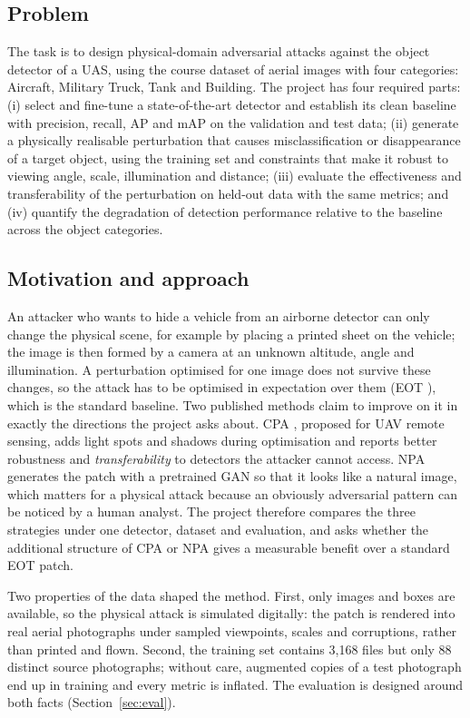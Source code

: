 \documentclass[11pt,a4paper]{article}
\begin{document}
\subsection{Problem}
The task is to design physical-domain adversarial attacks against the object detector of a UAS, using the course dataset of aerial images with four categories: Aircraft, Military Truck, Tank and Building. The project has four required parts: (i) select and fine-tune a state-of-the-art detector and establish its clean baseline with precision, recall, AP and mAP on the validation and test data; (ii) generate a physically realisable perturbation that causes misclassification or disappearance of a target object, using the training set and constraints that make it robust to viewing angle, scale, illumination and distance; (iii) evaluate the effectiveness and transferability of the perturbation on held-out data with the same metrics; and (iv) quantify the degradation of detection performance relative to the baseline across the object categories.

\subsection{Motivation and approach}
An attacker who wants to hide a vehicle from an airborne detector can only change the physical scene, for example by placing a printed sheet on the vehicle; the image is then formed by a camera at an unknown altitude, angle and illumination. A perturbation optimised for one image does not survive these changes, so the attack has to be optimised in expectation over them (EOT \cite{athalye2018}), which is the standard baseline. Two published methods claim to improve on it in exactly the directions the project asks about. CPA \cite{zhang2024cpa}, proposed for UAV remote sensing, adds light spots and shadows during optimisation and reports better robustness and \emph{transferability} to detectors the attacker cannot access. NPA \cite{hu2021npa} generates the patch with a pretrained GAN so that it looks like a natural image, which matters for a physical attack because an obviously adversarial pattern can be noticed by a human analyst. The project therefore compares the three strategies under one detector, dataset and evaluation, and asks whether the additional structure of CPA or NPA gives a measurable benefit over a standard EOT patch.

Two properties of the data shaped the method. First, only images and boxes are available, so the physical attack is simulated digitally: the patch is rendered into real aerial photographs under sampled viewpoints, scales and corruptions, rather than printed and flown. Second, the training set contains 3,168 files but only 88 distinct source photographs; without care, augmented copies of a test photograph end up in training and every metric is inflated. The evaluation is designed around both facts (Section~\ref{sec:eval}).
\end{document}
